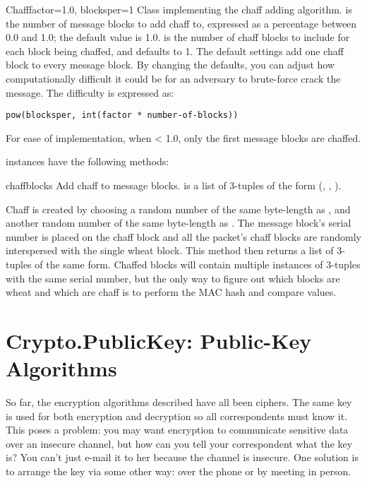 \documentclass{howto}
\begin{document}
\begin{classdesc}{Chaff}{factor=1.0, blocksper=1}
Class implementing the chaff adding algorithm. 
 is the number of message blocks 
            to add chaff to, expressed as a percentage between 0.0 and 1.0; the default value is 1.0.
 is the number of chaff blocks to include for each block
            being chaffed, and defaults to 1.  The default settings 
add one chaff block to every
            message block.  By changing the defaults, you can adjust how
            computationally difficult it could be for an adversary to
            brute-force crack the message.  The difficulty is expressed as:

\begin{verbatim}
pow(blocksper, int(factor * number-of-blocks))
\end{verbatim}

For ease of implementation, when  < 1.0, only the first
 message blocks are chaffed.
\end{classdesc}

 instances have the following methods:

\begin{methoddesc}{chaff}{blocks}
Add chaff to message blocks.   is a list of 3-tuples of the
form (, , ).

Chaff is created by choosing a random number of the same
byte-length as , and another random number of the same
byte-length as .  The message block's serial number is placed
on the chaff block and all the packet's chaff blocks are randomly
interspersed with the single wheat block.  This method then
returns a list of 3-tuples of the same form.  Chaffed blocks will
contain multiple instances of 3-tuples with the same serial
number, but the only way to figure out which blocks are wheat and
which are chaff is to perform the MAC hash and compare values.
\end{methoddesc}


\section{Crypto.PublicKey: Public-Key Algorithms}
So far, the encryption algorithms described have all been  ciphers.  The same key is used for both encryption and decryption
so all correspondents must know it.  This poses a problem: you may
want encryption to communicate sensitive data over an insecure
channel, but how can you tell your correspondent what the key is?  You
can't just e-mail it to her because the channel is insecure.  One
solution is to arrange the key via some other way: over the phone or
by meeting in person.
\end{document}
